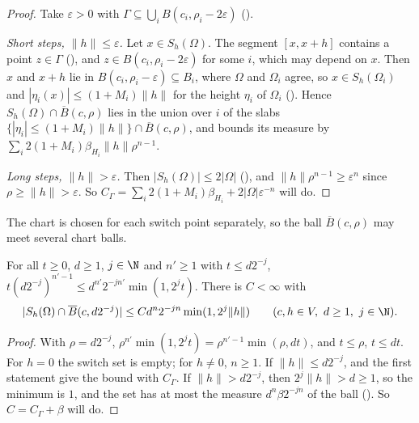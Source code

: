 \begin{proof}
\leanok
Take $\varepsilon > 0$ with $\Gamma \subseteq \bigcup_i B(c_i, \rho_i - 2\varepsilon)$
().

\emph{Short steps, $\|h\| \leq \varepsilon$.} Let $x \in S_h(\Omega)$. The segment $[x, x + h]$
contains a point $z \in \Gamma$ (), and
$z \in B(c_i, \rho_i - 2\varepsilon)$ for some $i$, which may depend on $x$. Then $x$ and $x + h$
lie in $B(c_i, \rho_i - \varepsilon) \subseteq B_i$, where $\Omega$ and $\Omega_i$ agree, so
$x \in S_h(\Omega_i)$ and $|\eta_i(x)| \leq (1 + M_i) \|h\|$ for the height $\eta_i$ of
$\Omega_i$ (). Hence $S_h(\Omega) \cap \overline B(c, \rho)$ lies in the
union over $i$ of the slabs $\{|\eta_i| \leq (1 + M_i) \|h\|\} \cap \overline B(c, \rho)$, and
 bounds its measure by $\sum_i 2 (1 + M_i) \beta_{H_i} \|h\| \rho^{n-1}$.

\emph{Long steps, $\|h\| > \varepsilon$.} Then $|S_h(\Omega)| \leq 2 |\Omega|$
(), and $\|h\| \rho^{n-1} \geq \varepsilon^n$ since
$\rho \geq \|h\| > \varepsilon$. So
$C_\Gamma = \sum_i 2 (1 + M_i) \beta_{H_i} + 2 |\Omega| \varepsilon^{-n}$ will do.
\end{proof}

The chart is chosen for each switch point separately, so the ball $\overline B(c, \rho)$ may meet
several chart balls.

\begin{corollary}
\label{cor:boundary-layer-atoms}
\leanok
{}
For all $t \geq 0$, $d \geq 1$, $j \in \N$ and $n' \geq 1$ with $t \leq d 2^{-j}$,
$t (d 2^{-j})^{n'-1} \leq d^{n'} 2^{-jn'} \min(1, 2^j t)$. There is $C < \infty$ with
\[
  |S_h(\Omega) \cap \overline B(c, d 2^{-j})| \leq C d^n 2^{-jn} \min(1, 2^j \|h\|)
  \qquad (c, h \in V,\ d \geq 1,\ j \in \N) .
\]
\end{corollary}

\begin{proof}
\leanok
With $\rho = d 2^{-j}$, $\rho^{n'} \min(1, 2^j t) = \rho^{n'-1} \min(\rho, d t)$, and $t \leq \rho$,
$t \leq d t$. For $h = 0$ the switch set is empty; for $h \neq 0$, $n \geq 1$. If
$\|h\| \leq d 2^{-j}$,  and the first statement give the bound
with $C_\Gamma$. If $\|h\| > d 2^{-j}$, then $2^j \|h\| > d \geq 1$, so the minimum is $1$, and
the set has at most the measure $d^n \beta 2^{-jn}$ of the ball ().
So $C = C_\Gamma + \beta$ will do.
\end{proof}

